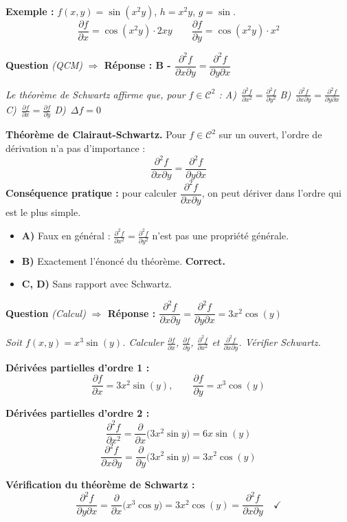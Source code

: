 \documentclass[11pt,a4paper]{article}
\newcounter{qnum}
\newcommand{\qtitre}[2]{%
  \stepcounter{qnum}%
  \medskip\noindent
  \textbf{\color{bleutexte}Question \theqnum}\enspace
  \textit{(#1)}\enspace
  \textcolor{vertok}{\textbf{$\Rightarrow$ Réponse : #2}}
  \par\smallskip
}
\newcommand{\qenonce}[1]{%
  \begin{mdframed}[backgroundcolor=grisbox, linewidth=0pt,
    innerleftmargin=8pt, innerrightmargin=8pt,
    innertopmargin=5pt, innerbottommargin=5pt,
    skipabove=2pt, skipbelow=4pt]
  \small\textit{#1}
  \end{mdframed}
}
\begin{document}
\textbf{Exemple :} $f(x,y) = \sin(x^2 y)$, $h = x^2 y$, $g = \sin$.
$$\frac{\partial f}{\partial x} = \cos(x^2y)\cdot 2xy \qquad \frac{\partial f}{\partial y} = \cos(x^2y)\cdot x^2$$

\qtitre{QCM}{B - $\dfrac{\partial^2 f}{\partial x\partial y} = \dfrac{\partial^2 f}{\partial y\partial x}$}
\qenonce{Le théorème de Schwartz affirme que, pour $f\in\mathcal{C}^2$ :
\quad A)~$\frac{\partial^2 f}{\partial x^2} = \frac{\partial^2 f}{\partial y^2}$
\quad B)~$\frac{\partial^2 f}{\partial x\partial y} = \frac{\partial^2 f}{\partial y\partial x}$
\quad C)~$\frac{\partial f}{\partial x} = \frac{\partial f}{\partial y}$
\quad D)~$\Delta f = 0$}

\begin{methodebox}
\textbf{Théorème de Clairaut-Schwartz.} Pour $f\in\mathcal{C}^2$ sur un ouvert, l'ordre de dérivation n'a pas d'importance :
$$\frac{\partial^2 f}{\partial x\partial y} = \frac{\partial^2 f}{\partial y\partial x}$$
\textbf{Conséquence pratique :} pour calculer $\dfrac{\partial^2 f}{\partial x\partial y}$, on peut dériver dans l'ordre qui est le plus simple.
\end{methodebox}

\begin{itemize}[leftmargin=1.5em, itemsep=2pt]
  \item \textcolor{rougeerr}{\textbf{A)}} Faux en général : $\frac{\partial^2 f}{\partial x^2} = \frac{\partial^2 f}{\partial y^2}$ n'est pas une propriété générale.
  \item \textcolor{vertok}{\textbf{B)}} Exactement l'énoncé du théorème. \textbf{Correct.}
  \item \textcolor{rougeerr}{\textbf{C, D)}} Sans rapport avec Schwartz.
\end{itemize}

\qtitre{Calcul}{$\dfrac{\partial^2 f}{\partial x\partial y} = \dfrac{\partial^2 f}{\partial y\partial x} = 3x^2\cos(y)$}
\qenonce{Soit $f(x,y)=x^3\sin(y)$. Calculer $\frac{\partial f}{\partial x}$, $\frac{\partial f}{\partial y}$, $\frac{\partial^2 f}{\partial x^2}$ et $\frac{\partial^2 f}{\partial x\partial y}$. Vérifier Schwartz.}

\begin{reponsebox}
\textbf{Dérivées partielles d'ordre 1 :}
$$\frac{\partial f}{\partial x} = 3x^2\sin(y), \qquad \frac{\partial f}{\partial y} = x^3\cos(y)$$

\textbf{Dérivées partielles d'ordre 2 :}
$$\frac{\partial^2 f}{\partial x^2} = \frac{\partial}{\partial x}\bigl(3x^2\sin y\bigr) = 6x\sin(y)$$
$$\frac{\partial^2 f}{\partial x\partial y} = \frac{\partial}{\partial y}\bigl(3x^2\sin y\bigr) = \boxed{3x^2\cos(y)}$$

\textbf{Vérification du théorème de Schwartz :}
$$\frac{\partial^2 f}{\partial y\partial x} = \frac{\partial}{\partial x}\bigl(x^3\cos y\bigr) = 3x^2\cos(y) = \frac{\partial^2 f}{\partial x\partial y} \quad\checkmark$$
\end{reponsebox}
\end{document}

